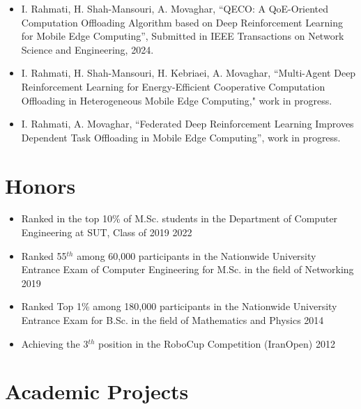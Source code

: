 \documentclass[11pt]{article}
\begin{document}
  \begin{itemize}
  	
  	\item I. Rahmati, H. Shah-Mansouri, A. Movaghar, ``QECO: A QoE-Oriented Computation Offloading Algorithm based on Deep Reinforcement Learning for Mobile Edge Computing'', Submitted in IEEE Transactions on Network Science and Engineering, 2024.
  	\href{https://arxiv.org/pdf/2311.02525}{\small  \faExternalLink}
  	\href{https://github.com/ImanRHT/QECO}{\faGithub}
  	
  	
  	\item I. Rahmati, H. Shah-Mansouri, H. Kebriaei, A. Movaghar, ``Multi-Agent Deep Reinforcement Learning for Energy-Efficient Cooperative Computation Offloading in Heterogeneous Mobile Edge Computing," work in progress.
  	
  	\item I. Rahmati, A. Movaghar, ``Federated Deep Reinforcement Learning Improves Dependent Task Offloading in Mobile Edge Computing'', work in progress.
  	

  \end{itemize}

\section{Honors}
\begin{itemize}
	\renewcommand\labelitemi{\ding{118}}
	\item{Ranked in the top 10\% of M.Sc. students in the Department of Computer Engineering at SUT, Class of 2019  \hfill  2022}\vspace{-2mm}
	\item {Ranked 55$^{th}$ among 60,000 participants in the Nationwide University Entrance Exam of Computer Engineering for M.Sc. in the field of Networking \hfill  2019}\vspace{-2mm}
	\item{Ranked Top 1\% among 180,000 participants in the Nationwide University Entrance Exam for B.Sc. in the field of Mathematics and Physics  \hfill  2014}\vspace{-2mm}
	\item{Achieving the 3$^{th}$ position in the RoboCup Competition (IranOpen)  \hfill  2012}\vspace{-2mm}
\end{itemize}


\section{Academic Projects}
\end{document}
